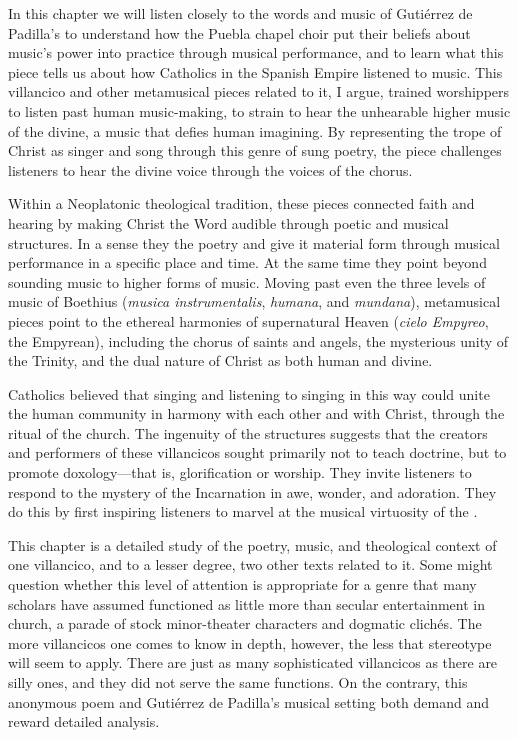 In this chapter we will listen closely to the words and music of Gutiérrez de
Padilla's  to understand how the Puebla chapel
choir put their beliefs about music's power into practice through musical
performance, and to learn what this piece tells us about how Catholics in the
Spanish Empire listened to music.
This villancico and other metamusical pieces related to it, I argue, trained
worshippers to listen past human music-making, to strain to hear the unhearable
higher music of the divine, a music that defies human imagining.
By representing the trope of Christ as singer and song through this genre of
sung poetry, the piece challenges listeners to hear the divine voice through the
voices of the chorus.

Within a Neoplatonic theological tradition, these pieces connected faith and
hearing by making Christ the Word audible through poetic and musical structures.
In a sense they  the poetry and give it material form through
musical performance in a specific place and time.
At the same time they point beyond sounding music to higher forms of music.
Moving past even the three levels of music of Boethius (\emph{musica
instrumentalis}, \emph{humana}, and \emph{mundana}), metamusical pieces point to
the ethereal harmonies of supernatural Heaven (\emph{cielo Empyreo}, the
Empyrean), including the chorus of saints and angels, the mysterious unity of
the Trinity, and the dual nature of Christ as both human and divine.

Catholics believed that singing and listening to singing in this way could unite
the human community in harmony with each other and with Christ, through the
ritual of the church.
The ingenuity of the structures suggests that the creators and performers of
these villancicos sought primarily not to teach doctrine, but to promote
doxology---that is, glorification or worship.
They invite listeners to respond to the mystery of the Incarnation in awe,
wonder, and adoration. 
They do this by first inspiring listeners to marvel at the musical virtuosity of
the .

This chapter is a detailed study of the poetry, music, and theological context
of one villancico, and to a lesser degree, two other texts related to it.
Some might question whether this level of attention is appropriate for a genre
that many scholars have assumed functioned as little more than secular
entertainment in church, a parade of stock minor-theater characters and
dogmatic clichés.
The more villancicos one comes to know in depth, however, the less that
stereotype will seem to apply.
There are just as many sophisticated villancicos as there are silly ones, and
they did not serve the same functions.
On the contrary, this anonymous poem and Gutiérrez de Padilla's musical setting
both demand and reward detailed analysis.

